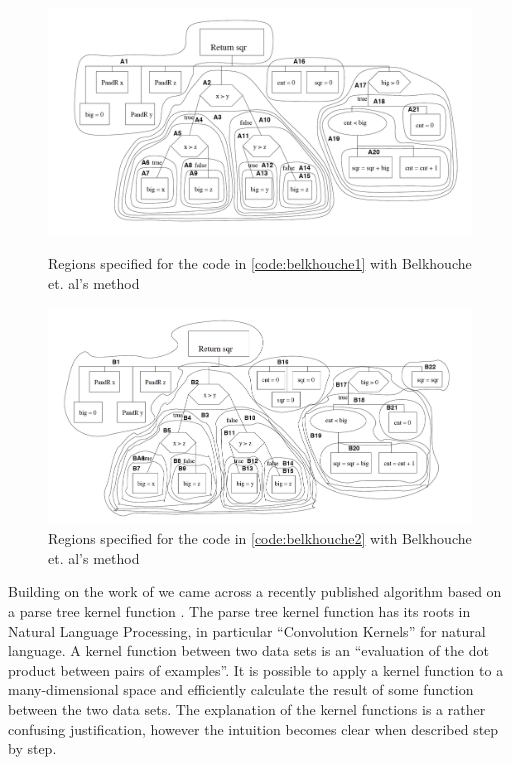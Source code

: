 \begin{figure}[p]
	\centering
		\includegraphics[width=\textwidth]{Figures/Belkhouche1}
	\caption{Regions specified for the code in \cref{code:belkhouche1} with Belkhouche et. al's method~\cite{Belkhouche}}
	\label{fig:belkhoucheRegions1}
	
	\centering
		\includegraphics[width=\textwidth]{Figures/Belkhouche2}
	\caption{Regions specified for the code in \cref{code:belkhouche2} with Belkhouche et. al's method~\cite{Belkhouche}}
	\label{fig:belkhoucheRegions2}

\end{figure}

Building on the work of \cite{Belkhouche}
we came across a recently published algorithm based on a parse tree kernel function
\cite{ParseTreeKernel}. The parse tree kernel function has its roots
in Natural Language Processing, in particular ``Convolution Kernels'' for natural
language\cite{NLPKernel}. A kernel function between two data sets is an ``evaluation
of the dot product between pairs of examples''\cite{NLPKernel}. It is possible
to apply a kernel function to a many-dimensional space and efficiently calculate
the result of some function between the two data sets. The explanation of the
kernel functions is a rather confusing justification, however the intuition
becomes clear when described step by step.

